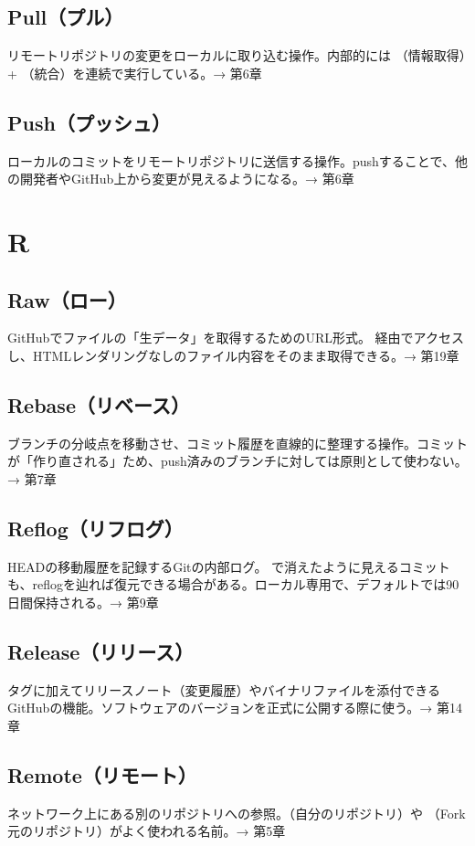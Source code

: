 \subsection*{Pull（プル）}
リモートリポジトリの変更をローカルに取り込む操作。内部的には （情報取得）+ （統合）を連続で実行している。→ 第6章

\subsection*{Push（プッシュ）}
ローカルのコミットをリモートリポジトリに送信する操作。pushすることで、他の開発者やGitHub上から変更が見えるようになる。→ 第6章

\section*{R}

\subsection*{Raw（ロー）}
GitHubでファイルの「生データ」を取得するためのURL形式。 経由でアクセスし、HTMLレンダリングなしのファイル内容をそのまま取得できる。→ 第19章

\subsection*{Rebase（リベース）}
ブランチの分岐点を移動させ、コミット履歴を直線的に整理する操作。コミットが「作り直される」ため、push済みのブランチに対しては原則として使わない。→ 第7章

\subsection*{Reflog（リフログ）}
HEADの移動履歴を記録するGitの内部ログ。 で消えたように見えるコミットも、reflogを辿れば復元できる場合がある。ローカル専用で、デフォルトでは90日間保持される。→ 第9章

\subsection*{Release（リリース）}
タグに加えてリリースノート（変更履歴）やバイナリファイルを添付できるGitHubの機能。ソフトウェアのバージョンを正式に公開する際に使う。→ 第14章

\subsection*{Remote（リモート）}
ネットワーク上にある別のリポジトリへの参照。（自分のリポジトリ）や （Fork元のリポジトリ）がよく使われる名前。→ 第5章


